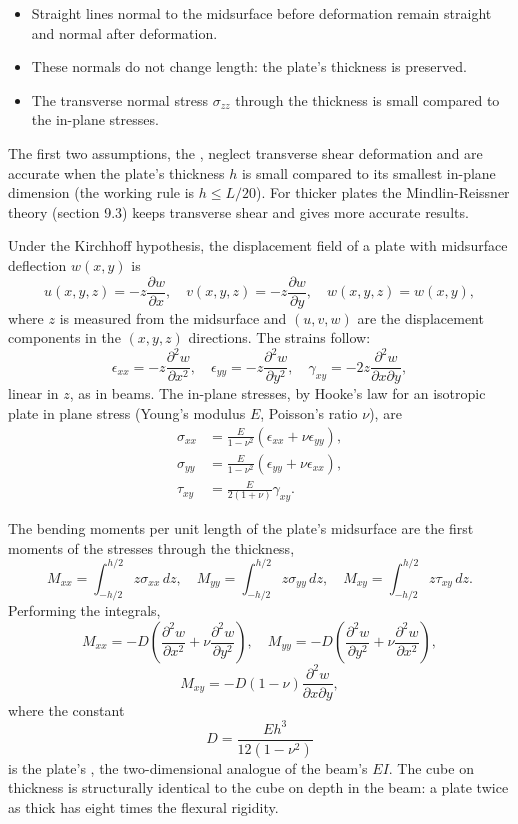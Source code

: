 \begin{itemize}[leftmargin=*]
  \item Straight lines normal to the midsurface before deformation
    remain straight and normal after deformation.
  \item These normals do not change length: the plate's thickness is
    preserved.
  \item The transverse normal stress $\sigma_{zz}$ through the
    thickness is small compared to the in-plane stresses.
\end{itemize}

The first two assumptions, the ,
neglect transverse shear deformation and are accurate when the
plate's thickness $h$ is small compared to its smallest in-plane
dimension (the working rule is $h \le L/20$). For thicker plates
the Mindlin-Reissner theory (section 9.3) keeps transverse shear and
gives more accurate results.

Under the Kirchhoff hypothesis, the displacement field of a plate
with midsurface deflection $w(x, y)$ is
\[
u(x, y, z) = -z \frac{\partial w}{\partial x}, \quad
v(x, y, z) = -z \frac{\partial w}{\partial y}, \quad
w(x, y, z) = w(x, y),
\]
where $z$ is measured from the midsurface and $(u, v, w)$ are the
displacement components in the $(x, y, z)$ directions. The strains
follow:
\[
\epsilon_{xx} = -z \frac{\partial^2 w}{\partial x^2}, \quad
\epsilon_{yy} = -z \frac{\partial^2 w}{\partial y^2}, \quad
\gamma_{xy} = -2 z \frac{\partial^2 w}{\partial x \partial y},
\]
linear in $z$, as in beams. The in-plane stresses, by Hooke's law
for an isotropic plate in plane stress (Young's modulus $E$,
Poisson's ratio $\nu$), are
\begin{align*}
\sigma_{xx} &= \frac{E}{1 - \nu^2}\left(\epsilon_{xx} + \nu
\epsilon_{yy}\right), \\
\sigma_{yy} &= \frac{E}{1 - \nu^2}\left(\epsilon_{yy} + \nu
\epsilon_{xx}\right), \\
\tau_{xy} &= \frac{E}{2(1+\nu)} \gamma_{xy}.
\end{align*}

The bending moments per unit length of the plate's midsurface are
the first moments of the stresses through the thickness,
\[
M_{xx} = \int_{-h/2}^{h/2} z \sigma_{xx} \,dz, \quad
M_{yy} = \int_{-h/2}^{h/2} z \sigma_{yy} \,dz, \quad
M_{xy} = \int_{-h/2}^{h/2} z \tau_{xy} \,dz.
\]
Performing the integrals,
\[
M_{xx} = -D \left(\frac{\partial^2 w}{\partial x^2} + \nu
\frac{\partial^2 w}{\partial y^2}\right), \quad
M_{yy} = -D \left(\frac{\partial^2 w}{\partial y^2} + \nu
\frac{\partial^2 w}{\partial x^2}\right),
\]
\[
M_{xy} = -D(1-\nu) \frac{\partial^2 w}{\partial x \partial y},
\]
where the constant
\[
D = \frac{E h^3}{12(1 - \nu^2)}
\]
is the plate's , the two-dimensional
analogue of the beam's $EI$. The cube on thickness is structurally
identical to the cube on depth in the beam: a plate twice as thick
has eight times the flexural rigidity.


